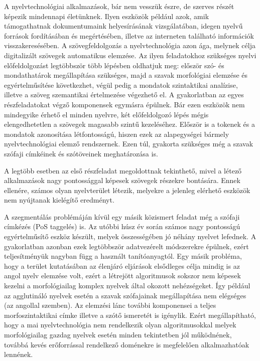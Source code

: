 
A nyelvtechnológiai alkalmazások, bár nem vesszük észre, de szerves részét képezik mindennapi életünknek.
Ilyen eszközök például azok, amik támogathatnak dokumentumaink helyesírásának vizsgálatában, idegen nyelvű források fordításában és megértésében, illetve az interneten található információk visszakeresésében.
A szövegfeldolgozás a nyelvtechnológia azon ága, melynek célja digitalizált szövegek automatikus elemzése.
Az ilyen feladatokhoz szükséges nyelvi előfeldolgozást legtöbbször több lépésben oldhatjuk meg: először szó- és mondathatárok megállapítása szükséges, majd a szavak morfológiai elemzése és egyértelműsítése következhet, végül pedig a mondatok szintaktikai analízise, illetve a szöveg szemantikai értelmezése végezhető el.
A gyakorlatban az egyes részfeladatokat végző komponensek egymásra épülnek.
Bár ezen eszközök nem mindegyike érhető el minden nyelvre, két előfeldolgozó lépés mégis elengedhetetlen a szövegek magasabb szintű kezeléséhez. 
Először is a tokenek és a mondatok azonosítása létfontosságú, hiszen ezek az alapegységei bármely nyelvtechnológiai elemző rendszernek.
Ezen túl, gyakorta szükséges még a szavak szófaji címkéinek és szótöveinek meghatározása is.

A legtöbb esetben az első részfeladat megoldottnak tekinthető, mivel a létező alkalmazások nagy pontossággal képesek szövegek részekre bontására.
Ennek ellenére, számos olyan nyelvterület létezik, melyekre a jelenleg elérhető eszközök nem nyújtanak kielégítő eredményt.

A szegmentálás problémáján kívül egy másik közismert feladat még a szófaji címkézés (PoS taggelés) is.
Az utóbbi húsz év során számos nagy pontosságú egyértelműsítő eszköz készült, melyek összességében jó néhány nyelvet lefednek.
A gyakorlatban azonban ezek legtöbbször adatvezérelt módszerekre épülnek, ezért teljesítményük nagyban függ a használt tanítóanyagtól.
Egy másik probléma, hogy a terület kutatásában az élenjáró eljárások elsődleges célja mindig is az angol nyelv elemzése volt, ezért a létrejött algoritmusok sokszor nem képesek kezelni a morfológiailag komplex nyelvek által okozott nehézségeket.
Így például az agglutináló nyelvek esetén a szavak szófajainak megállapítása nem elégséges (az angollal szemben).
Az elemzési lánc további komponensei a teljes morfoszintaktikai címke illetve a szótő ismeretét is igénylik.
Ezért megállapítható, hogy a mai nyelvtechnológia nem rendelkezik olyan algoritmusokkal melyek morfológiailag gazdag nyelvek esetén minden tekintetben jól működnének, továbbá kevés erőforrással rendelkező doménekre is megfelelően alkalmazhatóak lennének.

